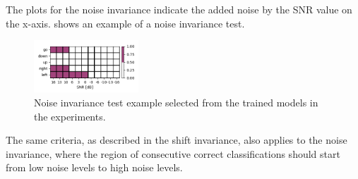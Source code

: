 \FloatBarrier
\noindent
The plots for the noise invariance indicate the added noise by the SNR value on the x-axis.
 shows an example of a noise invariance test.
\begin{figure}[!ht]
  \centering
    \includegraphics[width=0.35\textwidth]{./5_exp/figs/exp_fs_cepstral_tb_noise_conv-jim_mfcc12_norm0.png}
  \caption{Noise invariance test example selected from the trained models in the experiments.}
  \label{fig:exp_details_tb_noise}
\end{figure}
\FloatBarrier
\noindent
The same criteria, as described in the shift invariance, also applies to the noise invariance, where the region of consecutive correct classifications should start from low noise levels to high noise levels.